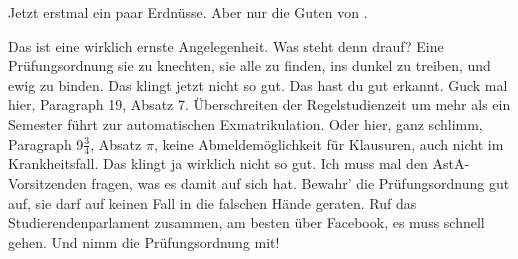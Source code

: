 \begin{verseplay}[7em]
\s{\Gandalf} Jetzt erstmal ein paar Erdnüsse. Aber nur die Guten von \Firmenname.
\end{verseplay}
\begin{verseplay}[7em]
\s{\Gandalf} Das ist eine wirklich ernste Angelegenheit. 
\s{\Frodo} Was steht denn drauf?
\s{\Gandalf}  Eine Prüfungsordnung sie zu knechten, sie alle zu finden, ins dunkel zu treiben, und ewig zu binden.
\s{\Frodo} Das klingt jetzt nicht so gut.
\s{\Gandalf} Das hast du gut erkannt.  Guck mal hier, Paragraph 19, Absatz 7. Überschreiten der Regelstudienzeit um mehr als ein Semester führt zur automatischen Exmatrikulation.  Oder hier,  ganz schlimm, Paragraph 9$\tfrac{3}{4}$, Absatz $\pi$, keine Abmeldemöglichkeit für Klausuren, auch nicht im Krankheitsfall.
\s{\Frodo} Das klingt ja wirklich nicht so gut.
\s{\Gandalf} Ich muss mal den AstA-Vorsitzenden \Saruman fragen, was es damit auf sich hat. Bewahr' die Prüfungsordnung gut auf, sie darf auf keinen Fall in die falschen Hände geraten. Ruf das Studierendenparlament zusammen, am besten über Facebook, es muss schnell gehen.  Und nimm die Prüfungsordnung mit!
\end{verseplay}

